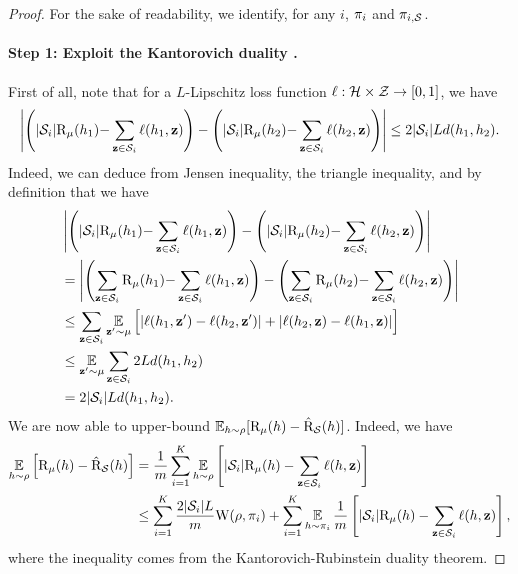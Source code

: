 \documentclass{article}
\begin{document}
\theoremsupervisedht*
\begin{proof}
For the sake of readability, we identify, for any $i$, $\P_i $ and $\P_{i,\S}$.
\paragraph{Step 1: Exploit the Kantorovich duality \cite[Remark 6.5]{villani2009optimal}.}
First of all, note that for a $L$-Lipschitz loss function $\loss: \H\times\Z\to[0,1]$, we have
\begin{align}
\LN\LP |\S_i|\Risk_{\D}(h_1){-}\sum_{\z\in\S_i}\loss(h_1, \z)\RP - \LP |\S_i|\Risk_{\D}(h_2){-}\sum_{\z\in\S_i}\loss(h_2, \z)\RP\RN \le 2|\S_i|Ld(h_1, h_2).\label{eq:proof-supervised-ht-1}
\end{align}
Indeed, we can deduce  from Jensen inequality, the triangle inequality, and by definition that we have
\begin{align*}
&\LN\LP |\S_i|\Risk_{\D}(h_1){-}\sum_{\z\in\S_i}\loss(h_1, \z)\RP - \LP |\S_i|\Risk_{\D}(h_2){-}\sum_{\z\in\S_i}\loss(h_2, \z)\RP\RN\\
&= \LN\LP\sum_{\z\in\S_i}\Risk_{\D}(h_1){-}\sum_{\z\in\S_i}\loss(h_1, \z)\RP - \LP\sum_{\z\in\S_i}\Risk_{\D}(h_2){-}\sum_{\z\in\S_i}\loss(h_2, \z)\RP\RN\\
&\le \sum_{\z\in\S_i}\EE_{\z'\sim\D}\Big[ |\loss(h_1, \z')-\loss(h_2, \z')|+|\loss(h_2, \z)-\loss(h_1, \z)|\Big]\\
&\le \EE_{\z'\sim\D}\sum_{\z\in\S_i} 2Ld(h_1, h_2)\\
&= 2|\S_i|Ld(h_1, h_2).
\end{align*}
We are now able to upper-bound $\EE_{h\sim\Q}[ \Risk_{\D}(h) - \Riskhat_{\S}(h) ]$. 
Indeed, we have
\begin{align}
\EE_{h\sim\Q}\Big[ \Risk_{\D}(h) - \Riskhat_{\S}(h) \Big] &= \frac{1}{m}\sum_{i=1}^{K} \EE_{h\sim\Q}\LB |\S_i|\Risk_{\D}(h) - \sum_{\z\in\S_i}\loss(h, \z) \RB\nonumber\\
&\le \sum_{i=1}^{K} \frac{2|\S_i|L}{m}\W(\Q, \P_i) + \sum_{i=1}^{K} \EE_{h\sim\P_i} \frac{1}{m}\LB |\S_i|\Risk_{\D}(h) - \sum_{\z\in\S_i} \loss(h, \z) \RB,\label{eq:proof-supervised-ht-2}
\end{align}
where the inequality comes from the Kantorovich-Rubinstein duality theorem.


\end{proof}
\end{document}
